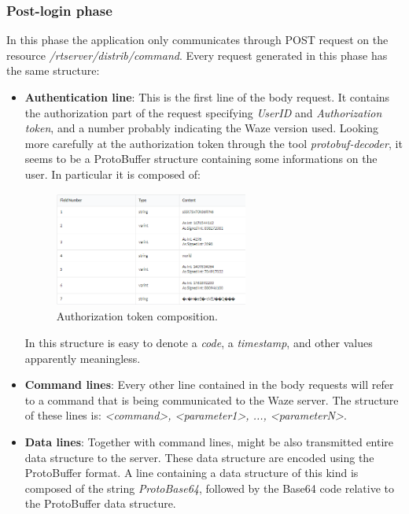 		\subsubsection{Post-login phase}
			\par In this phase the application only communicates through POST request on the resource \textit{/rtserver/distrib/command}. Every request generated in this phase has the same structure:			
			\begin{itemize}
				\item \textbf{Authentication line}: This is the first line of the body request. It contains the authorization part of the request specifying \textit{UserID} and \textit{Authorization token}, and a number probably indicating the Waze version used. \newline
				Looking more carefully at the authorization token through the tool \textit{protobuf-decoder}, it seems to be a ProtoBuffer structure containing some informations on the user. In particular it is composed of:
				\begin{figure}[H]
					\centering
					\includegraphics[width=0.6\textwidth]{images/waze_logintoken.png}
					\caption{Authorization token composition.}
				\end{figure}
				In this structure is easy to denote a \textit{code}, a \textit{timestamp}, and other values apparently meaningless.
				\item \textbf{Command lines}: Every other line contained in the body requests will refer to a command that is being communicated to the Waze server. The structure of these lines is: \textit{<command>, <parameter1>, ..., <parameterN>}. 
				\item \textbf{Data lines}: Together with command lines, might be also transmitted entire data structure to the server. These data structure are encoded using the ProtoBuffer format. A line containing a data structure of this kind is composed of the string \textit{ProtoBase64}, followed by the Base64 code relative to the ProtoBuffer data structure. 
			\end{itemize}
